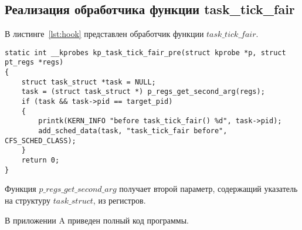\subsection{Реализация обработчика функции task\_tick\_fair}

В листинге~\ref{lst:hook} представлен обработчик функции $task\_tick\_fair$.

\begin{lstlisting}[label=lst:hook,caption=Обработчик функции task\_tick\_fair]
static int __kprobes kp_task_tick_fair_pre(struct kprobe *p, struct pt_regs *regs) 
{
	struct task_struct *task = NULL;
	task = (struct task_struct *) p_regs_get_second_arg(regs);
	if (task && task->pid == target_pid)
	{
		printk(KERN_INFO "before task_tick_fair() %d", task->pid);
		add_sched_data(task, "task_tick_fair before", CFS_SCHED_CLASS);
	}
	return 0;
}
\end{lstlisting}
Функция $p\_regs\_get\_second\_arg$ получает второй параметр, содержащий указатель на структуру $task\_struct$, из регистров.

В приложении A приведен полный код программы.
